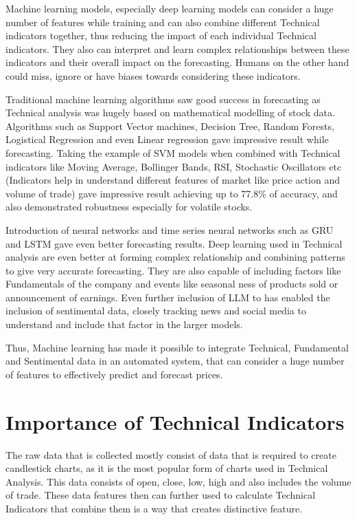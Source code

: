 Machine learning models, especially deep learning models can consider a huge number of features while training and can also combine different Technical indicators together, thus reducing the impact of each individual Technical indicators. They also can interpret and learn complex relationships between these indicators and their overall impact on the forecasting. Humans on the other hand could miss, ignore or have biases towards considering these indicators.

Traditional machine learning algorithms saw good success in forecasting as Technical analysis was hugely based on mathematical modelling of stock data. Algorithms such as Support Vector machines, Decision Tree, Random Forests, Logistical Regression and even Linear regression gave impressive result while forecasting. Taking the example of SVM models when combined with Technical indicators like Moving Average, Bollinger Bands, RSI, Stochastic Oscillators etc (Indicators help in understand different features of market like price action and volume of trade) gave impressive result achieving up to 77.8\% of accuracy, and also demonstrated robustness especially for volatile stocks.

Introduction of neural networks and time series neural networks such as GRU and LSTM gave even better forecasting results. Deep learning used in Technical analysis are even better at forming complex relationship and combining patterns to give very accurate forecasting. They are also capable of including factors like Fundamentals of the company and events like seasonal ness of products sold or announcement of earnings. Even further inclusion of LLM to  has enabled the inclusion of sentimental data, closely tracking news and social media to understand and include that factor in the larger models.

Thus, Machine learning has made it possible to integrate Technical, Fundamental and Sentimental data in an automated system, that can consider a huge number of features to effectively predict and forecast prices. 

\section{Importance of Technical Indicators}

The raw data that is collected mostly consist of data that is required to create candlestick charts, as it is the most popular form of charts used in Technical Analysis. This data consists of open, close, low, high and also includes the volume of trade. These data features then can further used to calculate Technical Indicators that combine them is a way that creates distinctive feature.

